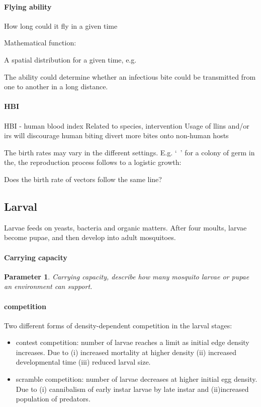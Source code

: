 \documentclass[a4paper, 12pt, twoside]{article}
\newtheorem{parameter}{Parameter}
\begin{document}
\paragraph{Flying ability}
How long could it fly in a given time

Mathematical function:

A spatial distribution for a given time, e.g.

The ability could determine whether an infectious bite could be transmitted from one to another in a long distance.

\paragraph{HBI}
HBI - human blood index
	Related to species, intervention
  Usage of \gls{llins} and/or \gls{irs} will discourage human biting divert more bites onto non-human hosts

	The birth rates may vary in the different settings. E.g. `\ ' for a colony of germ in the, the reproduction process follows to a logistic growth:
	
	Does the birth rate of vectors follow the same line?

\subsection{Larval}

Larvae feeds on yeasts, bacteria and organic matters. After four moults, larvae become pupae, and then develop into adult mosquitoes.
\paragraph{Carrying capacity}%
\label{par:carrying_capacity}
\begin{parameter}
 Carrying capacity, describe how many mosquito larvae or pupae an environment can support.
\end{parameter}

\paragraph{competition}%
\label{par:competition}
Two different forms of density-dependent competition in the larval stages:

\begin{itemize}
  \item contest competition: number of larvae reaches a limit as initial edge density increases. Due to (i) increased mortality at higher density (ii) increased developmental time (iii) reduced larval size.
  \item scramble competition: number of larvae decreases at higher initial egg density. Due to (i) cannibalism of early instar larvae by late instar and (ii)increased population of predators.
\end{itemize}
\end{document}
